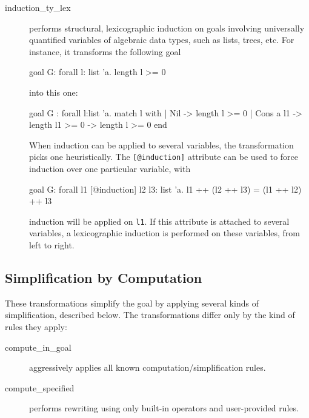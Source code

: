 \begin{description}
\item[induction\_ty\_lex]
  performs structural, lexicographic induction on
  goals involving universally quantified variables of algebraic data
  types, such as lists, trees, etc. For instance, it transforms the
  following goal
\begin{whycode}
goal G: forall l: list 'a. length l >= 0
\end{whycode}
  into this one:
\begin{whycode}
goal G :
  forall l:list 'a.
     match l with
     | Nil -> length l >= 0
     | Cons a l1 -> length l1 >= 0 -> length l >= 0
     end
\end{whycode}
  When induction can be applied to several variables, the transformation
  picks one heuristically. The \verb|[@induction]| attribute can be used to
  force induction over one particular variable, \eg with
\begin{whycode}
goal G: forall l1 [@induction] l2 l3: list 'a.
        l1 ++ (l2 ++ l3) = (l1 ++ l2) ++ l3
\end{whycode}
induction will be applied on \verb|l1|. If this attribute is attached to
several variables, a lexicographic induction is performed on these
variables, from left to right.




\end{description}

\subsection{Simplification by Computation}

These transformations simplify the goal by applying several kinds of
simplification, described below. The transformations differ only by
the kind of rules they apply:
\begin{description}
\item[compute\_in\_goal] aggressively applies all known
  computation/simplification rules.

\item[compute\_specified] performs rewriting using only built-in
  operators and user-provided rules.
\end{description}


